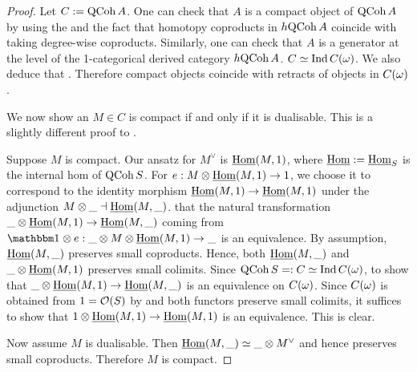 \documentclass[./main.tex]{subfiles}
\begin{document}
\begin{proof}

  Let $C := \mathrm{QCoh}\,A$.
  One can check that $A$ is a compact object of $\mathrm{QCoh}\,A$ by
  using the  and the fact that
  homotopy coproducts in $h\mathrm{QCoh}\,A$ coincide with
  taking degree-wise coproducts.
  Similarly, one can check that $A$ is a generator
  at the level of the 1-categorical derived category $h\mathrm{QCoh}\,A$.
   $C \simeq \mathrm{Ind}\,C(\omega)$.
  We also deduce that .
  Therefore compact objects coincide with retracts of objects in $C(\omega)$.

  We now show an $M \in C$ is compact if and only if it is dualisable.
  This is a slightly different proof to \cite[Lem 3.4]{BZFN}.

  Suppose $M$ is compact.
  Our ansatz for $M^\vee$ is $\underline{\mathrm{Hom}}(M,1)$,
  where $\underline{\mathrm{Hom}} := \underline{\mathrm{Hom}}_S$ is the internal hom of
  $\mathrm{QCoh}\,S$.
  For $e : M \otimes \underline{\mathrm{Hom}}(M,1) \to 1$,
  we choose it to correspond to the identity morphism 
  $\underline{\mathrm{Hom}}(M,1) \to \underline{\mathrm{Hom}}(M,1)$ under the adjunction
  $M\otimes \_ \dashv \underline{\mathrm{Hom}}(M , \_)$.
  that the natural transformation 
  $\_ \otimes \underline{\mathrm{Hom}}(M , 1) \to \underline{\mathrm{Hom}}(M , \_)$
  coming from 
  $\id{} \otimes e : \_ \otimes M \otimes \underline{\HOM}(M , 1) \to \_$
  is an equivalence.
  By assumption, $\underline{\mathrm{Hom}}(M , \_)$ preserves small coproducts.
  {Hence}, both $\underline{\mathrm{Hom}}(M , \_)$ and 
  $\_ \otimes \underline{\mathrm{Hom}}(M , 1)$ preserves small colimits.
  Since $\mathrm{QCoh}\,S =: C \simeq \mathrm{Ind}\,C(\omega)$,
   to show that
  $\_ \otimes \underline{\mathrm{Hom}}(M , 1) \to \underline{\mathrm{Hom}}(M , \_)$
  is an equivalence on $C(\omega)$.
  Since $C(\omega)$ is obtained from $1 = \mathcal{O}(S)$ by 
   and 
  both functors preserve small colimits, it suffices to show that
  $1 \otimes \underline{\mathrm{Hom}}(M , 1) \to \underline{\mathrm{Hom}}(M , 1)$
  is an equivalence.
  This is clear.

  Now assume $M$ is dualisable.
  Then $\underline{\mathrm{Hom}}(M , \_) \simeq \_ \otimes M^\vee$
  and hence preserves small coproducts.
  Therefore $M$ is compact.

\end{proof}
\end{document}
